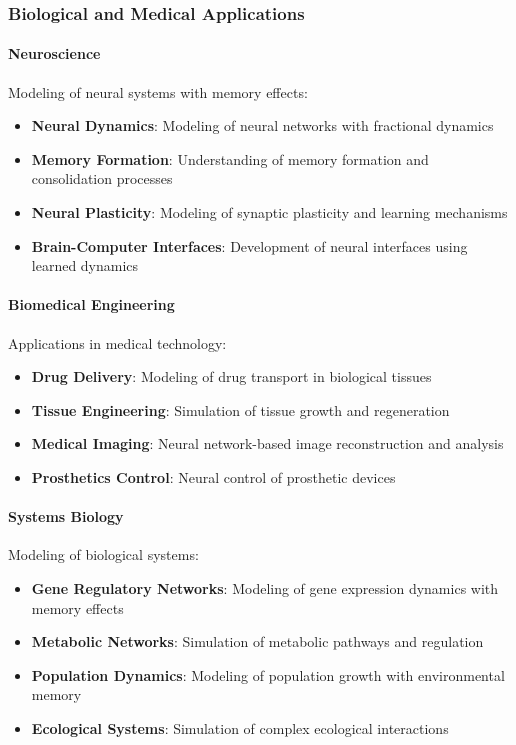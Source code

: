 \subsubsection{Biological and Medical Applications}

\paragraph{Neuroscience}
Modeling of neural systems with memory effects:

\begin{itemize}
    \item \textbf{Neural Dynamics}: Modeling of neural networks with fractional dynamics
    \item \textbf{Memory Formation}: Understanding of memory formation and consolidation processes
    \item \textbf{Neural Plasticity}: Modeling of synaptic plasticity and learning mechanisms
    \item \textbf{Brain-Computer Interfaces}: Development of neural interfaces using learned dynamics
\end{itemize}

\paragraph{Biomedical Engineering}
Applications in medical technology:

\begin{itemize}
    \item \textbf{Drug Delivery}: Modeling of drug transport in biological tissues
    \item \textbf{Tissue Engineering}: Simulation of tissue growth and regeneration
    \item \textbf{Medical Imaging}: Neural network-based image reconstruction and analysis
    \item \textbf{Prosthetics Control}: Neural control of prosthetic devices
\end{itemize}

\paragraph{Systems Biology}
Modeling of biological systems:

\begin{itemize}
    \item \textbf{Gene Regulatory Networks}: Modeling of gene expression dynamics with memory effects
    \item \textbf{Metabolic Networks}: Simulation of metabolic pathways and regulation
    \item \textbf{Population Dynamics}: Modeling of population growth with environmental memory
    \item \textbf{Ecological Systems}: Simulation of complex ecological interactions
\end{itemize}

